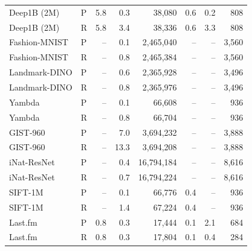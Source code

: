 \begin{tabular}{llrrrrrr}
Deep1B (2M) & P & 5.8 & 0.3 & 38,080 & 0.6 & 0.2 & 808 \\
Deep1B (2M) & R & 5.8 & 3.4 & 38,336 & 0.6 & 3.3 & 808 \\
Fashion-MNIST & P & -- & 0.1 & 2,465,040 & -- & -- & 3,560 \\
Fashion-MNIST & R & -- & 0.8 & 2,465,384 & -- & -- & 3,560 \\
Landmark-DINO & P & -- & 0.6 & 2,365,928 & -- & -- & 3,496 \\
Landmark-DINO & R & -- & 0.8 & 2,365,976 & -- & -- & 3,496 \\
Yambda & P & -- & 0.1 & 66,608 & -- & -- & 936 \\
Yambda & R & -- & 0.8 & 66,704 & -- & -- & 936 \\
GIST-960 & P & -- & 7.0 & 3,694,232 & -- & -- & 3,888 \\
GIST-960 & R & -- & 13.3 & 3,694,208 & -- & -- & 3,888 \\
iNat-ResNet & P & -- & 0.4 & 16,794,184 & -- & -- & 8,616 \\
iNat-ResNet & R & -- & 0.7 & 16,794,224 & -- & -- & 8,616 \\
SIFT-1M & P & -- & 0.1 & 66,776 & 0.4 & -- & 936 \\
SIFT-1M & R & -- & 1.4 & 67,224 & 0.4 & -- & 936 \\
Last.fm & P & 0.8 & 0.3 & 17,444 & 0.1 & 2.1 & 684 \\
Last.fm & R & 0.8 & 0.3 & 17,804 & 0.1 & 0.4 & 284 \\
\bottomrule
\end{tabular}
